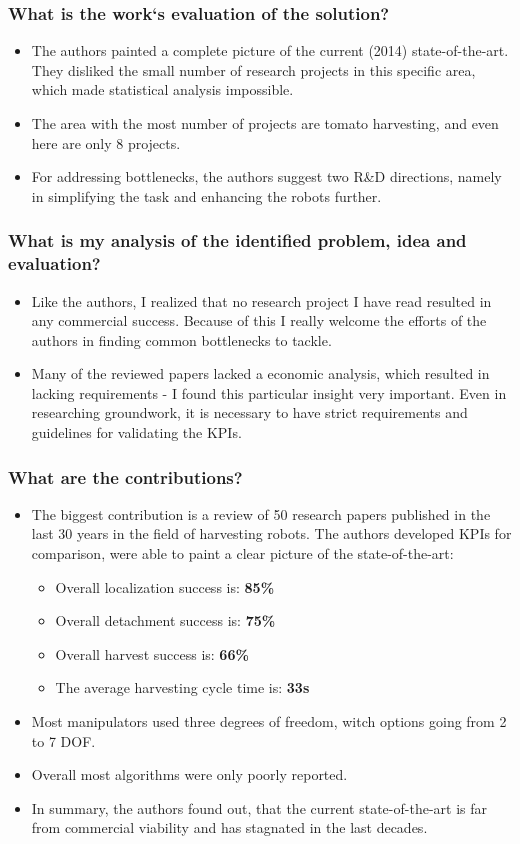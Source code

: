 \documentclass{article}
\begin{document}
\subsubsection*{What is the work`s evaluation of the solution?}
\begin{itemize}
    \item The authors painted a complete picture of the current (2014) state-of-the-art. They disliked the small number of research projects in this specific area, which made statistical analysis impossible.
    \item The area with the most number of projects are tomato harvesting, and even here are only 8 projects. 
    \item For addressing bottlenecks, the authors suggest two R\&D directions, namely in simplifying the task and enhancing the robots further.
\end{itemize}
\subsubsection*{What is my analysis of the identified problem, idea and evaluation?}
\begin{itemize}
    \item Like the authors, I realized that no research project I have read resulted in any commercial success. Because of this I really welcome the efforts of the authors in finding common bottlenecks to tackle. 
    \item Many of the reviewed papers lacked a economic analysis, which resulted in lacking requirements - I found this particular insight very important. Even in researching groundwork, it is necessary to have strict requirements and guidelines for validating the KPIs.
\end{itemize}
\subsubsection*{What are the contributions?}
\begin{itemize}
    \item The biggest contribution is a review of 50 research papers published in the last 30 years in the field of harvesting robots. The authors developed KPIs for comparison, were able to paint a clear picture of the state-of-the-art: \ \begin{itemize}
        \item Overall localization success is: \textbf{85\%}
        \item Overall detachment success is: \textbf{75\%}
        \item Overall harvest success is: \textbf{66\%}
        \item The average harvesting cycle time is: \textbf{33s}
    \end{itemize}
    \item Most manipulators used three degrees of freedom, witch options going from 2 to 7 DOF.
    \item Overall most algorithms were only poorly reported.
    \item In summary, the authors found out, that the current state-of-the-art is far from commercial viability and has stagnated in the last decades. 
\end{itemize}
\end{document}

